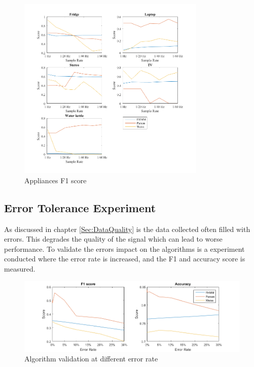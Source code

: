 \begin{figure}[H]
\centering
\includegraphics[width=0.8\textwidth]{billeder/App-F1Score.png}
\caption{Appliances F1 score}
\label{fig:AppF1}
\end{figure}

\newpage

\subsection{Error Tolerance Experiment}
\label{Sec:ETE}
As discussed in chapter \ref{Sec:DataQuality} is the data collected often filled with errors. This degrades the quality of the signal which can lead to worse performance. To validate the errors impact on the algorithms is a experiment conducted where the error rate is increased, and the F1 and accuracy score is measured. 

\begin{figure}[H]
\centering
\includegraphics[width=1\textwidth]{billeder/AlgoErrorRate.png}
\caption{Algorithm validation at different error rate}
\label{fig:ErrorEx}
\end{figure}

